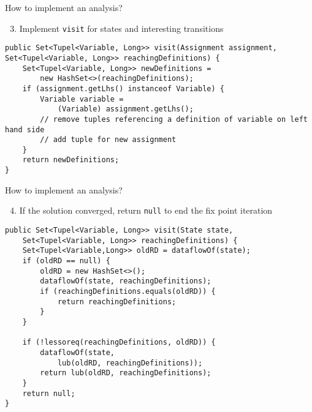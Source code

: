 \documentclass[xcolor={usenames,dvipsnames}, aspectratio=169, 12pt]{beamer}
\begin{document}
\begin{frame}[fragile]{How to implement an analysis?}
\begin{enumerate}
	\setcounter{enumi}{2}
	\item Implement \texttt{visit} for states and interesting transitions
\end{enumerate}

\begin{lstlisting}
public Set<Tupel<Variable, Long>> visit(Assignment assignment, Set<Tupel<Variable, Long>> reachingDefinitions) {
	Set<Tupel<Variable, Long>> newDefinitions =
		new HashSet<>(reachingDefinitions);
	if (assignment.getLhs() instanceof Variable) {
		Variable variable =
			(Variable) assignment.getLhs();
		// remove tuples referencing a definition of variable on left hand side
		// add tuple for new assignment
	}
	return newDefinitions;
}
\end{lstlisting}
\end{frame}

\begin{frame}[fragile]{How to implement an analysis?}
\begin{enumerate}
	\setcounter{enumi}{3}
	\item If the solution converged, return \texttt{null} to end the fix point iteration
\end{enumerate}

\vspace{-0.3cm}
\begin{lstlisting}
public Set<Tupel<Variable, Long>> visit(State state,
	Set<Tupel<Variable, Long>> reachingDefinitions) {
	Set<Tupel<Variable,Long>> oldRD = dataflowOf(state);
	if (oldRD == null) {
		oldRD = new HashSet<>();
		dataflowOf(state, reachingDefinitions);
		if (reachingDefinitions.equals(oldRD)) {
			return reachingDefinitions;
		}
	}
	
	if (!lessoreq(reachingDefinitions, oldRD)) {
		dataflowOf(state,
			lub(oldRD, reachingDefinitions));
		return lub(oldRD, reachingDefinitions);
	}
	return null;
}
\end{lstlisting}
\end{frame}
\end{document}
